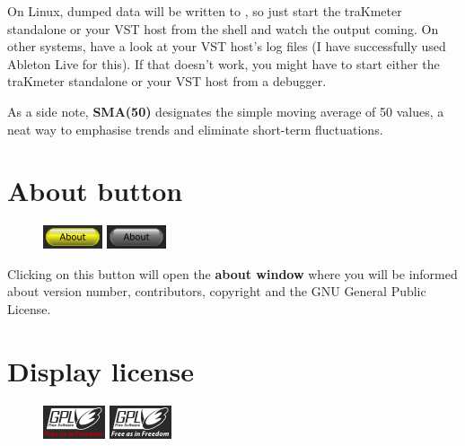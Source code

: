 On Linux, dumped data will be written to , so just start
the traKmeter standalone or your VST host from the shell and watch the
output coming.  On other systems, have a look at your VST host's log
files (I have successfully used Ableton Live for this).  If that
doesn't work, you might have to start either the traKmeter standalone
or your VST host from a debugger.

As a side note, \textbf{SMA(50)} designates the simple moving average
of 50 values, a neat way to emphasise trends and eliminate short-term
fluctuations.

\newpage %

\section{About button}

\begin{figure}
  \includegraphics[scale=\screenshotscale,clip]{include/images/button_about_on.png}
  \newline \vspace{-0.9\baselineskip}
  \includegraphics[scale=\screenshotscale,clip]{include/images/button_about_off.png}
\end{figure}

Clicking on this button will open the \textbf{about window} where you
will be informed about version number, contributors, copyright and the
GNU General Public License.

\section{Display license}

\begin{figure}
  \includegraphics[scale=\screenshotscale,clip]{include/images/button_gpl_on.png}
  \newline \vspace{-0.9\baselineskip}
  \includegraphics[scale=\screenshotscale,clip]{include/images/button_gpl_off.png}
\end{figure}


